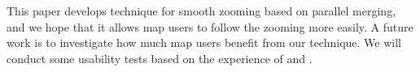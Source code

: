 \documentclass[ijgi,article,submit,moreauthors,pdftex]{Definitions/mdpi}
\begin{document}
This paper develops technique for smooth zooming based on parallel merging,
and we hope that it allows map users to follow the zooming more easily.
A future work is to investigate 
how much map users benefit from our technique.
We will conduct some usability tests based on the experience of
\citet[]{Suba2017Thesis} and \citet{Midtbo2007}.












\end{document}
